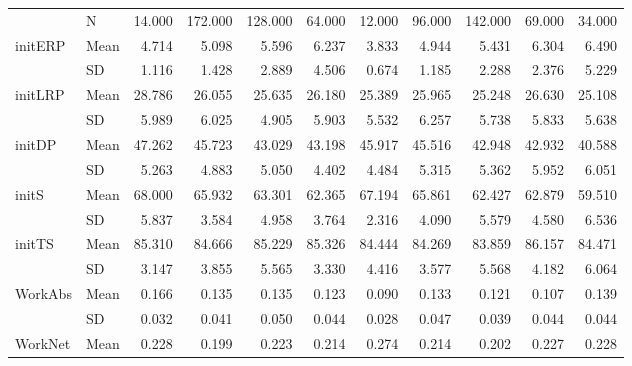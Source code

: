 \begin{longtable}{llrrrrrrrrr}
\bottomrule
\endlastfoot
{} & N &     14.000 &    172.000 &    128.000 &     64.000 &     12.000 &     96.000 &    142.000 &     69.000 &     34.000 \\
\multirow{2}{*}{initERP} & Mean &      4.714 &      5.098 &      5.596 &      6.237 &      3.833 &      4.944 &      5.431 &      6.304 &      6.490 \\
   & SD &      1.116 &      1.428 &      2.889 &      4.506 &      0.674 &      1.185 &      2.288 &      2.376 &      5.229 \\
\cline{1-11}
\multirow{2}{*}{initLRP} & Mean &     28.786 &     26.055 &     25.635 &     26.180 &     25.389 &     25.965 &     25.248 &     26.630 &     25.108 \\
   & SD &      5.989 &      6.025 &      4.905 &      5.903 &      5.532 &      6.257 &      5.738 &      5.833 &      5.638 \\
\cline{1-11}
\multirow{2}{*}{initDP} & Mean &     47.262 &     45.723 &     43.029 &     43.198 &     45.917 &     45.516 &     42.948 &     42.932 &     40.588 \\
   & SD &      5.263 &      4.883 &      5.050 &      4.402 &      4.484 &      5.315 &      5.362 &      5.952 &      6.051 \\
\cline{1-11}
\multirow{2}{*}{initS} & Mean &     68.000 &     65.932 &     63.301 &     62.365 &     67.194 &     65.861 &     62.427 &     62.879 &     59.510 \\
   & SD &      5.837 &      3.584 &      4.958 &      3.764 &      2.316 &      4.090 &      5.579 &      4.580 &      6.536 \\
\cline{1-11}
\multirow{2}{*}{initTS} & Mean &     85.310 &     84.666 &     85.229 &     85.326 &     84.444 &     84.269 &     83.859 &     86.157 &     84.471 \\
   & SD &      3.147 &      3.855 &      5.565 &      3.330 &      4.416 &      3.577 &      5.568 &      4.182 &      6.064 \\
\cline{1-11}
\multirow{2}{*}{WorkAbs} & Mean &      0.166 &      0.135 &      0.135 &      0.123 &      0.090 &      0.133 &      0.121 &      0.107 &      0.139 \\
   & SD &      0.032 &      0.041 &      0.050 &      0.044 &      0.028 &      0.047 &      0.039 &      0.044 &      0.044 \\
\cline{1-11}
\multirow{2}{*}{WorkNet} & Mean &      0.228 &      0.199 &      0.223 &      0.214 &      0.274 &      0.214 &      0.202 &      0.227 &      0.228 \\

\end{longtable}
